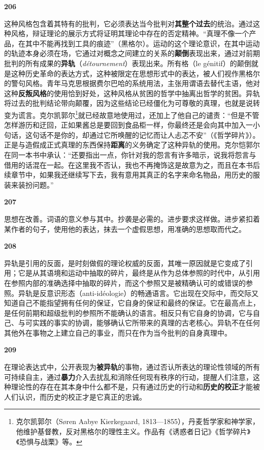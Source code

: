 \documentclass[fontset=fandol, a4paper, 12pt, openright]{ctexbook}
\makeatletter
\newcommand{\thesis}[1]{%
    \par\vspace{1.5em}%
    {\centering \textbf{\Large #1}\par}%
    \nobreak\vspace{0.5em}\nobreak
    \@afterindenttrue %
    \@afterheading    %
}
\makeatother
\begin{document}
\thesis{206}
这种风格包含着其特有的批判，它必须表达当今批判对\textbf{其整个过去}的统治。通过这种风格，辩证理论的展示方式将证明其理论中存在的否定精神。“真理不像一个产品，在其中不能再找到工具的痕迹”（黑格尔）。运动的这个理论意识，在其中运动的轨迹本身必须在场，它通过对概念之间建立的关系的\textbf{颠倒}表现出来，通过对前期批判的所有成果的\textbf{异轨}（\textit{détournement}）表现出来。所有格（le génitif）的颠倒就是这种历史革命的表达方式，这种被限定在思想形式中的表达，被人们视作黑格尔的警句风格。青年马克思根据费尔巴哈的系统用法，主张用谓语去替代主语，他对这种\textbf{反叛风格}的使用恰到好处，这种风格从贫困的哲学中抽离出哲学的贫困。异轨将过去的批判结论带向颠覆，因为这些结论已经僵化为可尊敬的真理，也就是说转变为谎言。克尔凯郭尔\footnote{克尔凯郭尔（Søren Aabye Kierkegaard, 1813—1855），丹麦哲学家和神学家，他维护基督教，反对黑格尔的理性主义。作品有《诱惑者日记》《哲学碎片》《恐惧与战栗》等。}就已经故意地使用过，还加上了他自己的谴责：“但是不管怎样游历和迂回，正如果酱总是要回到食品柜一样，你最终还是会向其中加入一小句话，这句话不是你的，却通过它所唤醒的记忆而让人忐忑不安”（《哲学碎片》）。正是与造假成正式真理的东西保持\textbf{距离}的义务确定了这种异轨的使用。克尔恺郭尔在同一本书中承认：“还要指出一点，你针对我的怨言有许多暗示，说我将怨言与借用的话混在一起。在这里我不否认，我也不再掩饰这是故意为之，而且在本书后续章节中，如果我还继续写下去，我有意用其真正的名字来命名物品，用历史的服装来装扮问题。”

\thesis{207}
思想在改善。词语的意义参与其中。抄袭是必需的。进步要求这样做。进步紧扣着某作者的句子，使用他的表达，抹去一个虚假思想，用准确的思想取而代之。

\thesis{208}
异轨是引用的反面，是时刻做假的理论权威的反面，其唯一原因就是它变成了引用；它是从其语境和运动中抽取的碎片，最终是从作为总体参照的时代中，从引用在参照内部的准确选择中抽取的碎片，而这个参照又是被精确认可的或错误的参照。异轨是反意识形态（anti-idéologie）的畅通语言。它出现在交际中，而交际又知道自己不能指望拥有任何的保证，它自身的保证和最终的保证。它在最高点上，是任何前期和超级批判的参照所不能确认的语言。相反只有它自身的协调，它与自己、与可实践的事实的协调，能够确认它所带来的真理的古老核心。异轨不在任何其他外在事物之上建立自己的事业，而只在作为当今批判的自身真理中。

\thesis{209}
在理论表达式中，公开表现为\textbf{被异轨}的事物，通过否认所表达的理论性领域的所有可持续自主，通过\textbf{暴力}介入去扰乱和消除任何现有秩序的行动，提醒人们注意，这种理论性的存在在其本身中什么都不是，只有通过历史的行动和\textbf{历史的校正}才能被人们认识，而历史的校正才是它真正的忠诚。
\end{document}
